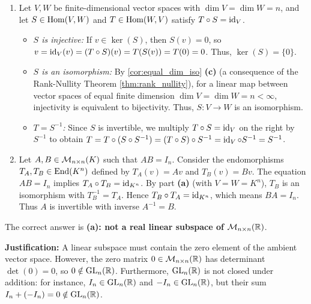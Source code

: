 \begin{exercisesolution}
\label{sol:one_sided_inverse_finite_dim}
\begin{enumerate}[label=\textbf{(\alph*)}]
    \item Let $V, W$ be finite-dimensional vector spaces with $\dim V = \dim W = n$, and let $S \in \operatorname{Hom}(V, W)$ and $T \in \operatorname{Hom}(W, V)$ satisfy $T \circ S = \operatorname{id}_V$.
    \begin{itemize}
        \item \emph{$S$ is injective:} If $v \in \ker(S)$, then $S(v) = 0$, so $v = \operatorname{id}_V(v) = (T \circ S)(v) = T(S(v)) = T(0) = 0$. Thus, $\ker(S) = \{0\}$.
        \item \emph{$S$ is an isomorphism:} By \cref{cor:equal_dim_iso} \textbf{(c)} (a consequence of the Rank-Nullity Theorem \cref{thm:rank_nullity}), for a linear map between vector spaces of equal finite dimension $\dim V = \dim W = n < \infty$, injectivity is equivalent to bijectivity. Thus, $S \colon V \to W$ is an isomorphism.
        \item \emph{$T = S^{-1}$:} Since $S$ is invertible, we multiply $T \circ S = \operatorname{id}_V$ on the right by $S^{-1}$ to obtain $T = T \circ (S \circ S^{-1}) = (T \circ S) \circ S^{-1} = \operatorname{id}_V \circ S^{-1} = S^{-1}$.
    \end{itemize}

    \item Let $A, B \in \mathcal{M}_{n \times n}(K)$ such that $AB = I_n$.
    Consider the endomorphisms $T_A, T_B \in \operatorname{End}(K^n)$ defined by $T_A(v) = Av$ and $T_B(v) = Bv$.
    The equation $AB = I_n$ implies $T_A \circ T_B = \operatorname{id}_{K^n}$.
    By part \textbf{(a)} (with $V = W = K^n$), $T_B$ is an isomorphism with $T_B^{-1} = T_A$.
    Hence $T_B \circ T_A = \operatorname{id}_{K^n}$, which means $BA = I_n$.
    Thus $A$ is invertible with inverse $A^{-1} = B$. \qedhere
\end{enumerate}
\end{exercisesolution}

\begin{exercisesolution*}
\label{sol:gl_not_subspace_sc}
The correct answer is \textbf{(a): not a real linear subspace of $\mathcal{M}_{n \times n}(\mathbb{R})$}.

\textbf{Justification:} A linear subspace must contain the zero element of the ambient vector space.
However, the zero matrix $0 \in \mathcal{M}_{n \times n}(\mathbb{R})$ has determinant $\det(0) = 0$, so $0 \notin \operatorname{GL}_n(\mathbb{R})$.
Furthermore, $\operatorname{GL}_n(\mathbb{R})$ is not closed under addition: for instance, $I_n \in \operatorname{GL}_n(\mathbb{R})$ and $-I_n \in \operatorname{GL}_n(\mathbb{R})$, but their sum $I_n + (-I_n) = 0 \notin \operatorname{GL}_n(\mathbb{R})$. \qedhere
{}
\end{exercisesolution*}
